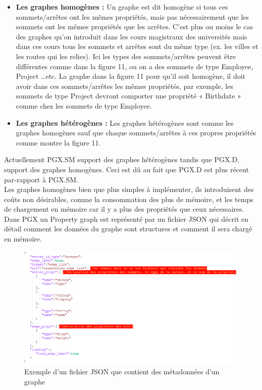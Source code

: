 \begin{itemize}[label=\textbullet]
\item  \textbf{Les graphes homogènes :}
Un graphe est dit homogène si tous ces sommets/arrêtes ont les mêmes propriétés, mais pas nécessairement que les sommets ont les mêmes propriétés que les arrêtes. C’est plus ou moins le cas des graphes qu’on introduit dans les cours magistraux des universités mais dans ces cours tous les sommets et arrêtes sont du même type (ex. les villes et les routes qui les relies). Ici les types des sommets/arrêtes peuvent être différentes comme dans la figure 11, ou on a des sommets de type Employee, Project …etc. La graphe dans la figure 11 pour qu’il soit homogène, il doit avoir dans ces sommets/arrêtes les mêmes propriétés, par exemple, les sommets de type Project devront comporter une propriété « Birthdate » comme chez les sommets de type Employee.
\item  \textbf{Les graphes hétérogènes :}
Les graphes hétérogènes sont comme les graphes homogènes sauf que chaque sommets/arrêtes à ces propres propriétés comme montre la figure 11.
\end{itemize}

Actuellement PGX.SM support des graphes hétérogènes tandis que PGX.D, support des graphes homogènes. Ceci est dû au fait que PGX.D est plus récent par-rapport à PGX.SM.\\
Les graphes homogènes bien que plus simples à implémenter, ils introduisent des coûts non désirables, comme la consommation des plus de mémoire, et les temps de chargement en mémoire car il y a plus des propriétés que ceux nécessaires.\\
\newpage
Dans PGX un Property graph est représenté par un fichier JSON qui décrit en détail comment les données du graphe sont structures et comment il sera chargé en mémoire.\\

\begin{figure}[h!]  
  \centering
    \includegraphics[width=1.2\textwidth]{chapitre2/Figures/GraphJSON.PNG}
  \caption{Exemple d'un fichier JSON que contient des métadonnées d'un graphe}
\end{figure}